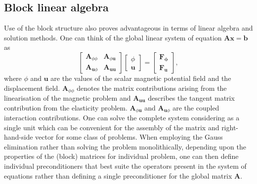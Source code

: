 \subsection*{Block linear algebra} 
Use of the block structure also proves advantageous in terms of linear algebra and solution methods. One can think of the global linear system of equation $\mathbf{A}\mathbf{x} = \mathbf{b}$ as
\begin{equation*}
\begin{bmatrix}
\mathbf{A}_{\phi\phi} & \mathbf{A}_{\phi \mathbf{u}} \\
\mathbf{A}_{\mathbf{u} \phi} & \mathbf{A}_{\mathbf{u}\mathbf{u}} 
\end{bmatrix}
\begin{bmatrix}
\phi \\
\mathbf{u}
\end{bmatrix} 
= 
\begin{bmatrix}
\mathbf{F_{\phi}} \\
\mathbf{F_{\mathbf{u}}}
\end{bmatrix},
\end{equation*}
where $\phi$ and $\mathbf{u}$ are the values of the scalar magnetic potential field and the displacement field. $\mathbf{A}_{\phi\phi}$ denotes the matrix contributions arising from the linearisation of the magnetic problem and $\mathbf{A}_{\mathbf{u}\mathbf{u}}$ describes the tangent matrix contribution from the elasticity problem. $\mathbf{A}_{\phi \mathbf{u}}$ and $\mathbf{A}_{\mathbf{u} \phi}$ are the coupled interaction contributions. One can solve the complete system considering as a single unit which can be convenient for the assembly of the matrix and right-hand-side vector for some class of problems. When employing the Gauss elimination rather than solving the problem monolithically, depending upon the properties of the (block) matrices for individual problem, one can then define individual preconditioners that best suite the operators present in the system of equations rather than defining a single preconditioner for the global matrix $\mathbf{A}$.

